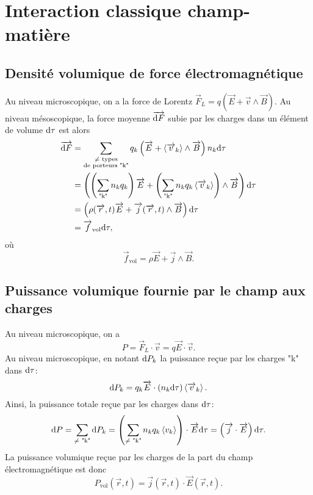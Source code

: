 \section{Interaction classique champ-matière}

\subsection{Densité volumique de force électromagnétique}

Au niveau microscopique, on a la force de Lorentz $\vec{F}_{L}=q\left(\vec{E}+\vec{v}\wedge\vec{B}\right)$. Au niveau mésoscopique, la force moyenne $\protect\overrightarrow{{\mathrm{d} F}}$ subie par les charges dans un élément de volume $\mathrm{d}\tau$ est alors
\begin{align*}
    \protect\overrightarrow{{\mathrm{d} F}}
    &=
    \sum_{\substack{\neq\text{ types}\\\text{de porteurs "k"}}}q_k\left(\protect\overrightarrow{{E}}+\left\langle \protect\overrightarrow{{v}}_k\right\rangle\wedge\protect\overrightarrow{{B}}\right)n_k\mathrm{d}\tau\\
    &=
    \left(\left(\sum_{\text{"k"}}n_k q_k\right)\protect\overrightarrow{{E}}+\left(\sum_{\text{"k"}}n_k q_k \left\langle\protect\overrightarrow{{v}}_k\right\rangle\right)\wedge\protect\overrightarrow{{B}}\right)\mathrm{d}\tau\\
    &=
    \left(\rho(\protect\overrightarrow{{r}},t)\protect\overrightarrow{{E}}+\protect\overrightarrow{{j}}(\protect\overrightarrow{{r}},t)\wedge\protect\overrightarrow{{B}}\right)\mathrm{d}\tau\\
    &=
    \protect\overrightarrow{{f}}_{\mathrm{vol}}\mathrm{d}\tau,
\end{align*}
où
\begin{equation*}
    \boxed{
        \vec{f}_{\mathrm{vol}}=\rho\vec{E}+\vec{j}\wedge\vec{B}.
    }
\end{equation*}

\subsection[Puissance volumique]{Puissance volumique fournie par le champ aux charges}

Au niveau microscopique, on a 
\begin{equation*}
    P=\vec{F}_L\cdot\vec{v}=q\vec{E}\cdot\vec{v}.
\end{equation*}
Au niveau microscopique, en notant $\mathrm{d} P_k$ la puissance reçue par les charges "k" dans $\mathrm{d}\tau$:
\begin{equation*}
    \mathrm{d} P_k=
    q_k\protect\overrightarrow{{E}}\cdot\left(n_k\mathrm{d}\tau\right)\left\langle \protect\overrightarrow{{v}}_k\right\rangle.
\end{equation*}
Ainsi, la puissance totale reçue par les charges dans $\mathrm{d}\tau$:
\begin{equation*}
    \mathrm{d} P
    =
    \sum_{\neq \text{ "k"}}\mathrm{d} P_k
    =
    \left(\sum_{\neq \text{ "k"}}n_k q_k\left\langle v_k\right\rangle\right)\cdot\protect\overrightarrow{{E}}\mathrm{d}\tau=\left(\protect\overrightarrow{{j}}\cdot\protect\overrightarrow{{E}}\right)\mathrm{d}\tau.
\end{equation*}
La puissance volumique reçue par les charges de la part du champ électromagnétique est donc
\begin{equation*}
    \boxed{
        P_{\mathrm{vol}}(\vec{r},t)=\vec{j}(\vec{r},t)\cdot\vec{E}(\vec{r},t).
    }
\end{equation*}

